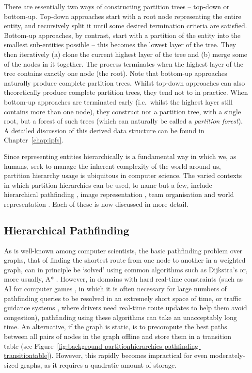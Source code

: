 There are essentially two ways of constructing partition trees -- top-down or bottom-up. Top-down approaches start with a root node representing the entire entity, and recursively split it until some desired termination criteria are satisfied. Bottom-up approaches, by contrast, start with a partition of the entity into the smallest sub-entities possible -- this becomes the lowest layer of the tree. They then iteratively (a) clone the current highest layer of the tree and (b) merge some of the nodes in it together. The process terminates when the highest layer of the tree contains exactly one node (the root). Note that bottom-up approaches naturally produce complete partition trees. Whilst top-down approaches can also theoretically produce complete partition trees, they tend not to in practice. When bottom-up approaches are terminated early (i.e.~whilst the highest layer still contains more than one node), they construct not a partition tree, with a single root, but a forest of such trees (which can naturally be called a \emph{partition forest}). A detailed discussion of this derived data structure can be found in Chapter~\ref{chap:ipfs}.

Since representing entities hierarchically is a fundamental way in which we, as humans, seek to manage the inherent complexity of the world around us, partition hierarchy usage is ubiquitous in computer science. The varied contexts in which partition hierarchies can be used, to name but a few, include hierarchical pathfinding \cite{kim98}, image representation \cite{al-haj08,andrade03,salembier00}, team organisation \cite{?} and world representation \cite{finkel74,fuchs80}. Each of these is now discussed in more detail.

\subsection{Hierarchical Pathfinding}

As is well-known among computer scientists, the basic pathfinding problem over graphs, that of finding the shortest route from one node to another in a weighted graph, can in principle be `solved' using common algorithms such as Dijkstra's or, more usually, A* \cite{aima}. However, in domains with hard real-time constraints (such as AI for computer games \cite{dickheiser04,vandersterren04}, in which it is often necessary for large numbers of pathfinding queries to be resolved in an extremely short space of time, or traffic guidance systems \cite{jing96,jung96,kim98}, where drivers need real-time route updates to help them avoid congestion), pathfinding using these algorithms can take an unacceptably long time. An alternative, if the graph is static, is to precompute the best paths between all pairs of nodes in the graph offline and store them in a transition table (see Figure~\ref{fig:background-partitionhierarchies-pathfinding-transitiontable}). However, this rapidly becomes impractical for even moderately-sized graphs, as it requires a quadratic amount of storage.

